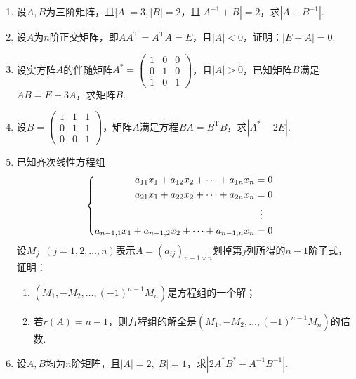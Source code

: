 \begin{enumerate}
    \item 设$A,B$为三阶矩阵，且$|A|=3,|B|=2$，且$|A^{-1}+B|=2$，求$|A+B^{-1}|$.

    \item 设$A$为$n$阶正交矩阵，即$AA^\mathrm{T}=A^\mathrm{T}A=E$，且$|A|<0$，证明：$|E+A|=0$.

    \item 设实方阵$A$的伴随矩阵$A^*=\begin{pmatrix}
        1 & 0 & 0 \\ 0 & 1 & 0 \\ 1 & 0 & 1
    \end{pmatrix}$，且$|A|>0$，已知矩阵$B$满足$AB=E+3A$，求矩阵$B$.

    \item 设$B=\begin{pmatrix}
        1 & 1 & 1 \\ 0 & 1 & 1 \\ 0 & 0 & 1
    \end{pmatrix}$，矩阵$A$满足方程$BA=B^\mathrm{T}B$，求$|A^*-2E|$.

    \item 已知齐次线性方程组
          \[\begin{cases} \begin{aligned}
                      a_{11}x_1+a_{12}x_2+\cdots+a_{1n}x_n          & = 0             \\
                      a_{21}x_1+a_{22}x_2+\cdots+a_{2n}x_n          & = 0             \\
                                                                    & \vdotswithin{=} \\
                      a_{n-1,1}x_1+a_{n-1,2}x_2+\cdots+a_{n-1,n}x_n & = 0
                  \end{aligned} \end{cases}\]
          设$M_j\enspace(j=1,2,\ldots,n)$表示$A=(a_{ij})_{n-1 \times n}$划掉第$j$列所得的$n-1$阶子式，证明：
          \begin{enumerate}
              \item $(M_1,-M_2,\ldots,(-1)^{n-1}M_n)$是方程组的一个解；

              \item 若$r(A)=n-1$，则方程组的解全是$(M_1,-M_2,\ldots,(-1)^{n-1}M_n)$的倍数.
          \end{enumerate}

    \item 设$A,B$均为$n$阶矩阵，且$|A|=2,|B|=1$，求$|2A^*B^*-A^{-1}B^{-1}|$.


\end{enumerate}
